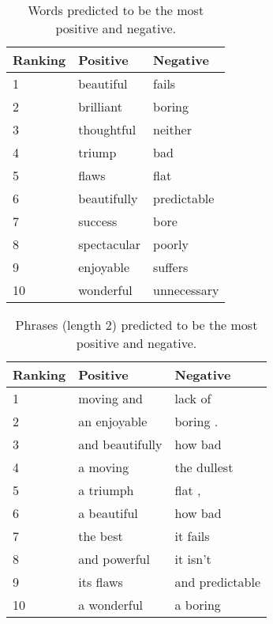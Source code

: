 \documentclass{article}
\newcommand{\ra}[1]{\renewcommand{\arraystretch}{#1}}
\begin{document}
\begin{table}[t]
    \centering

    \caption{Words predicted to be the most positive and negative.} 
    \label{tab:words}

    \ra{1.2}
    \begin{tabular}{@{} l l l @{}}
        \\
        \toprule
        \bf{Ranking} & \bf{Positive} & \bf{Negative} \\
        \midrule
        1 & beautiful   & fails  \\
        2 & brilliant   & boring \\
        3 & thoughtful  & neither\\
        4 & triump      & bad \\
        5 & flaws       & flat \\
        6 & beautifully & predictable \\
        7 & success     & bore \\
        8 & spectacular & poorly \\
        9 & enjoyable   & suffers \\
        10 & wonderful  & unnecessary \\
        \bottomrule
    \end{tabular}
\end{table}


\begin{table}[t]
    \centering

    \caption{Phrases (length 2) predicted to be the most positive and negative.} 
    \label{tab:phrases}

    \ra{1.2}
    \begin{tabular}{@{} l l l @{}}
        \\
        \toprule
        \bf{Ranking} & \bf{Positive} & \bf{Negative} \\
        \midrule
        1 & moving and      & lack of \\
        2 & an enjoyable    & boring .\\
        3 & and beautifully & how bad \\
        4 & a moving        & the dullest \\
        5 & a triumph       & flat , \\
        6 & a beautiful     & how bad \\
        7 & the best        & it fails \\
        8 & and powerful    & it isn't \\
        9 & its flaws       & and predictable \\
        10 & a wonderful    & a boring \\
        \bottomrule
    \end{tabular}
\end{table}
\end{document}
